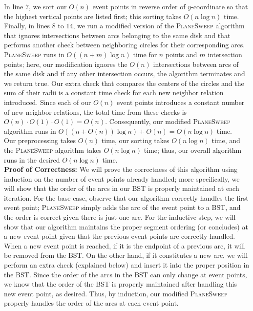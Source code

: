 \documentclass[11pt]{article}
\begin{document}
\begin{enumerate}
    In line $7$, we sort our $O(n)$ event points in reverse order of $y$-coordinate so that the highest vertical points are listed first; this sorting takes $O(n \log n)$ time. Finally, in lines $8$ to $14$, we run a modified version of the \textsc{PlaneSweep} algorithm that ignores intersections between arcs belonging to the same disk and that performs another check between neighboring circles for their corresponding arcs. 
    \textsc{PlaneSweep} runs in $O((n+m) \log n)$ time for $n$ points and $m$ intersection points; here, our modification ignores the $O(n)$ intersections between arcs of the same disk and if any other intersection occurs, the algorithm terminates and we return true. Our extra check that compares the centers of the circles and the sum of their radii is a constant time check for each new neighbor relation introduced. 
    Since each of our $O(n)$ event points introduces a constant number of new neighbor relations, the total time from these checks is $O(n) \cdot O(1) \cdot O(1) = O(n)$. Consequently, our modified \textsc{PlaneSweep} algorithm runs in $O((n+ O(n))\log n) + O(n) = O(n \log n)$ time. \\

    Our preprocessing takes $O(n)$ time, our sorting takes $O(n \log n)$ time, and the \textsc{PlaneSweep} algorithm takes $O(n \log n)$ time; thus, our overall algorithm runs in the desired $O(n \log n)$ time. \\

    \textbf{Proof of Correctness:} We will prove the correctness of this algorithm using induction on the number of event points already handled; more specifically, we will show that the order of the arcs in our BST is properly maintained at each iteration. For the base case, observe that our algorithm correctly handles the first event point; \textsc{PlaneSweep} simply adds the arc of the event point to a BST, and the order is correct given there is just one arc. 
    For the inductive step, we will show that our algorithm maintains the proper segment ordering (or concludes) at a new event point given that the previous event points are correctly handled. When a new event point is reached, if it is the endpoint of a previous arc, it will be removed from the BST. 
    On the other hand, if it constitutes a new arc, we will perform an extra check (explained below) and insert it into the proper position in the BST. Since the order of the arcs in the BST can only change at event points, we know that the order of the BST is properly maintained after handling this new event point, as desired. 
    Thus, by induction, our modified \textsc{PlaneSweep} properly handles the order of the arcs at each event point.  \\
    

\end{enumerate}
\end{document}
